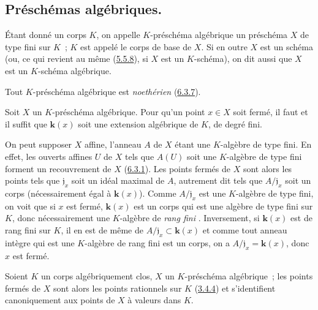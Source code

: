 \subsection{Préschémas algébriques.}
\label{subsection:I.6.4-fr}

\begin{definition}[6.4.1]
\label{I.6.4.1-fr}
Étant donné un corps $K$, on appelle $K$-préschéma algébrique un
préschéma $X$ de type fini sur $K$~; $K$ est appelé le corps de base
de $X$. Si en outre $X$ est un schéma \textup{(ou, ce qui revient au même
(\hyperref[I.5.5.8-fr]{5.5.8}), si $X$ est un $K$-}schéma\textup{)}, on dit aussi que
$X$ est un $K$-schéma algébrique.
\end{definition}

Tout $K$-préschéma algébrique est \emph{noethérien}
(\hyperref[I.6.3.7-fr]{6.3.7}).

\begin{proposition}[6.4.2]
\label{I.6.4.2-fr}
Soit $X$ un $K$-préschéma algébrique. Pour qu'un point $x\in X$ soit fermé,
il faut et il suffit que $\boldsymbol{k}(x)$ soit une extension algébrique de $K$, de degré
fini.
\end{proposition}

On peut supposer $X$ affine, l'anneau $A$ de $X$ étant une $K$-algèbre de type
fini. En effet, les ouverts affines $U$ de $X$ tels que $A(U)$ soit une
$K$-algèbre de type fini forment un recouvrement de $X$
(\hyperref[I.6.3.1-fr]{6.3.1}). Les points fermés de $X$ sont alors les points
tels que $\mathfrak{j}_x$ soit
un idéal maximal de $A$, autrement dit tels que $A/\mathfrak{j}_x$ soit un
corps (nécessairement égal à $\boldsymbol{k}(x)$). Comme $A/\mathfrak{j}_x$ est une
$K$-algèbre de type fini, on voit que si $x$ est fermé, $\boldsymbol{k}(x)$ est un corps
qui est une algèbre de type fini sur $K$, donc nécessairement une $K$-algèbre
de \emph{rang fini} \cite{I-21}. Inversement, si $\boldsymbol{k}(x)$ est de rang fini sur
$K$, il en est de même de $A/\mathfrak{j}_x\subset \boldsymbol{k}(x)$ et comme tout anneau
intègre qui est une $K$-algèbre de rang fini est un corps, on a
$A/\mathfrak{j}_x=\boldsymbol{k}(x)$, donc $x$ est fermé.

\begin{corollary}[6.4.3]
\label{I.6.4.3-fr}
Soient $K$ un corps algébriquement clos, $X$ un $K$-préschéma algébrique~; les
points fermés de $X$ sont alors les points rationnels sur $K$
\textup{(\hyperref[I.3.4.4-fr]{3.4.4})} et s'identifient canoniquement aux points de
$X$ à valeurs dans $K$.
\end{corollary}

